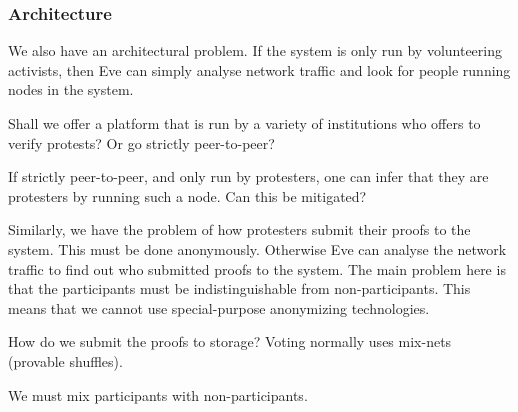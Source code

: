 \subsubsection{Architecture}

We also have an architectural problem.
If the system is only run by volunteering activists, then Eve can simply 
analyse network traffic and look for people running nodes in the system.

\begin{question}
  Shall we offer a platform that is run by a variety of institutions who 
  offers to verify protests?
  Or go strictly peer-to-peer?
\end{question}

\begin{question}
  If strictly peer-to-peer, and only run by protesters, one can infer that 
  they are protesters by running such a node.
  Can this be mitigated?
\end{question}

Similarly, we have the problem of how protesters submit their proofs to the 
system.
This must be done anonymously.
Otherwise Eve can analyse the network traffic to find out who submitted proofs 
to the system.
The main problem here is that the participants must be indistinguishable from 
non-participants.
This means that we cannot use special-purpose anonymizing 
technologies.

\begin{question}
  How do we submit the proofs to storage?
  Voting normally uses mix-nets (provable shuffles).
\end{question}

\begin{remark}
  We must mix participants with non-participants.
\end{remark}


